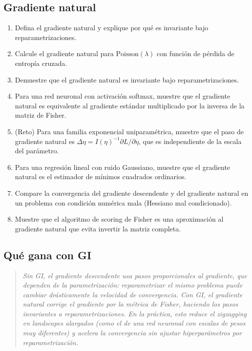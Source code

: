 \subsection*{Gradiente natural}
\begin{enumerate}[resume]
	\item[$\star$] Defina el gradiente natural y explique por qué es invariante bajo reparametrizaciones.
	\item[$\star\star$] Calcule el gradiente natural para $\mathrm{Poisson}(\lambda)$ con función de pérdida de entropía cruzada.
	\item[$\star\star\star$] Demuestre que el gradiente natural es invariante bajo reparametrizaciones.
	\item[$\star\star\star$] Para una red neuronal con activación softmax, muestre que el gradiente natural es equivalente al gradiente estándar multiplicado por la inversa de la matriz de Fisher.
	\item[$\star\star\star\star$] (Reto) Para una familia exponencial uniparamétrica, muestre que el paso de gradiente natural es $\Delta\eta = I(\eta)^{-1} \partial L / \partial\eta$, que es independiente de la escala del parámetro.
	\item[$\star\star$] Para una regresión lineal con ruido Gaussiano, muestre que el gradiente natural es el estimador de mínimos cuadrados ordinarios.
	\item[$\star\star\star$] Compare la convergencia del gradiente descendente y del gradiente natural en un problema con condición numérica mala (Hessiano mal condicionado).
	\item[$\star\star\star$] Muestre que el algoritmo de scoring de Fisher es una aproximación al gradiente natural que evita invertir la matriz completa.
\end{enumerate}

\subsection*{Qué gana con GI}
\begin{quote}
	\itshape
	Sin GI, el gradiente descendente usa pasos proporcionales al gradiente, que dependen de la parametrización: reparametrizar el mismo problema puede cambiar drásticamente la velocidad de convergencia.  Con GI, el gradiente natural corrige el gradiente por la métrica de Fisher, haciendo los pasos \emph{invariantes} a reparametrizaciones.  En la práctica, esto reduce el zigzagging en landscapes alargados (como el de una red neuronal con escalas de pesos muy diferentes) y acelera la convergencia sin ajustar hiperparámetros por reparametrización.
\end{quote}
